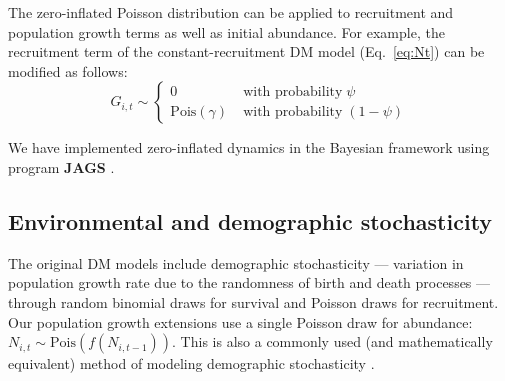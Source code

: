 \documentclass[12pt]{article}
\begin{document}

The zero-inflated Poisson distribution can be applied to recruitment and 
population growth terms as well as initial abundance. For example, 
the recruitment term of the constant-recruitment DM model
(Eq.~\ref{eq:Nt}) can be modified as follows:
\begin{equation}
G_{i,t} \sim \left\{
\begin{aligned}
0 &\; \text{with probability} \; \psi \\
\mathrm{Pois}(\gamma) &\; \text{with probability} \; (1-\psi)\end{aligned} \right.
\label{eq:ZIPts}
\end{equation}

We have implemented
zero-inflated dynamics in the Bayesian framework using program
\textbf{JAGS} \citep[version 3.2.0]{plummer:2003}.


\subsection{Environmental and demographic stochasticity}

The original DM models include demographic stochasticity --- variation in population growth 
rate due to the randomness of birth and death processes --- through random 
binomial draws for survival and Poisson draws for recruitment.  Our population
growth extensions use a single Poisson draw for abundance: $N_{i,t} \sim 
\mathrm{Pois}(f(N_{i,t-1}))$.  This is also a commonly used (and mathematically equivalent) 
method of modeling demographic stochasticity 
\citep{bonsall_hastings:2004,melbourne_hastings:2008}.  
\end{document}
